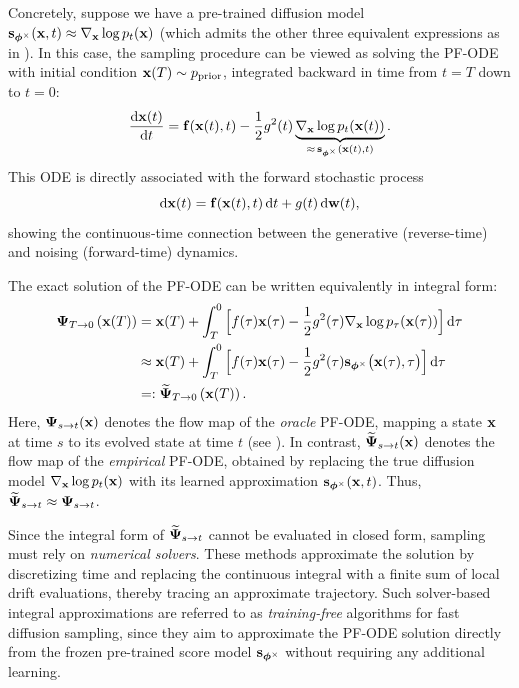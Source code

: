 Concretely, suppose we have a pre-trained diffusion model ${\mathbf{s}}_{\bm{\phi}^\times}({\mathbf{x}}, t) \approx \nabla_{{\mathbf{x}}}\log p_t({\mathbf{x}})$ (which admits the other three equivalent expressions as in ). 
In this case, the sampling procedure can be viewed as solving the PF-ODE with initial condition ${\mathbf{x}}(T) \sim p_{\text{prior}}$, integrated backward in time from $t = T$ down to $t = 0$:
\begin{align*}
    \frac{\mathop{}\!\mathrm{d} {\mathbf{x}}(t)}{\mathop{}\!\mathrm{d} t} 
     =  {\mathbf{f}}({\mathbf{x}}(t),t) 
    - \frac{1}{2} g^2(t) \underbrace{\nabla_{{\mathbf{x}}}\log p_t({\mathbf{x}}(t))}_{\approx\,  {\mathbf{s}}_{\bm{\phi}^\times}({\mathbf{x}}(t), t)}.
\end{align*}
This ODE is directly associated with the forward stochastic process
\[
\mathop{}\!\mathrm{d}{\mathbf{x}}(t) = {\mathbf{f}}({\mathbf{x}}(t),t)\mathop{}\!\mathrm{d} t + g(t)\mathop{}\!\mathrm{d}{\mathbf{w}}(t),
\]
showing the continuous-time connection between the generative (reverse-time) and noising (forward-time) dynamics.

The exact solution of the PF-ODE can be written equivalently in integral form:
\begin{align}\label{eq:solution-int-score}
\begin{aligned}
    {\bm{\Psi}}_{T\to 0} \left({\mathbf{x}}(T)\right) 
    &= {\mathbf{x}}(T) + \int_T^0  \Big[f(\tau){\mathbf{x}}(\tau) - \frac{1}{2}g^2(\tau) \nabla_{{\mathbf{x}}}\log p_\tau({\mathbf{x}}(\tau))\Big]\mathop{}\!\mathrm{d} \tau \\
    &\approx {\mathbf{x}}(T) + \int_T^0  \Big[f(\tau){\mathbf{x}}(\tau) - \frac{1}{2}g^2(\tau) {\mathbf{s}}_{\bm{\phi}^\times} \big({\mathbf{x}}(\tau), \tau\big)\Big]\mathop{}\!\mathrm{d} \tau \\
    &=:\widetilde{{\bm{\Psi}}}_{T\to 0} \left({\mathbf{x}}(T)\right).
\end{aligned}
\end{align}
Here, ${\bm{\Psi}}_{s\to t}({\mathbf{x}})$ denotes the flow map of the \emph{oracle} PF-ODE, mapping a state ${\mathbf{x}}$ at time $s$ to its evolved state at time $t$ (see ). In contrast, $\widetilde{{\bm{\Psi}}}_{s\to t}({\mathbf{x}})$ denotes the flow map of the \emph{empirical} PF-ODE, obtained by replacing the true diffusion model $\nabla_{{\mathbf{x}}}\log p_t({\mathbf{x}})$ with its learned approximation ${\mathbf{s}}_{\bm{\phi}^\times}({\mathbf{x}},t)$. Thus, $\widetilde{{\bm{\Psi}}}_{s\to t}  \approx  {\bm{\Psi}}_{s\to t}$.

Since the integral form of $\widetilde{{\bm{\Psi}}}_{s\to t}$ cannot be evaluated in
closed form, sampling must rely on \emph{numerical solvers}. These methods
approximate the solution by discretizing time and replacing the continuous
integral with a finite sum of local drift  evaluations, thereby tracing an
approximate trajectory. Such solver-based integral approximations are referred
to as \emph{training-free} algorithms for fast diffusion sampling, since they aim
to approximate the PF-ODE solution directly from the frozen pre-trained score
model ${\mathbf{s}}_{\bm{\phi}^\times}$ without requiring any additional learning.

